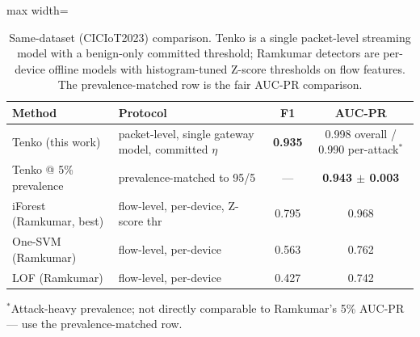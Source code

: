 \documentclass[10pt]{article}
\begin{document}
\begin{table}[h]
\centering
\caption{Same-dataset (CICIoT2023) comparison. Tenko is a single packet-level streaming model
with a benign-only committed threshold; Ramkumar detectors are per-device offline models with
histogram-tuned Z-score thresholds on flow features. The prevalence-matched row is the fair
AUC-PR comparison.}
\label{tab:sameds}
\begin{adjustbox}{max width=\textwidth}
\begin{tabular}{l l cc}
\toprule
\textbf{Method} & \textbf{Protocol} & \textbf{F1} & \textbf{AUC-PR} \\
\midrule
Tenko (this work)        & packet-level, single gateway model, committed $\eta$ & \textbf{0.935} & 0.998 overall / 0.990 per-attack$^\ast$ \\
\;Tenko @ 5\% prevalence & prevalence-matched to 95/5                          & --- & \textbf{0.943 $\pm$ 0.003} \\
iForest (Ramkumar, best) & flow-level, per-device, Z-score thr                 & 0.795 & 0.968 \\
One-SVM (Ramkumar)       & flow-level, per-device                              & 0.563 & 0.762 \\
LOF (Ramkumar)           & flow-level, per-device                              & 0.427 & 0.742 \\
\bottomrule
\end{tabular}
\end{adjustbox}
\end{table}
{\footnotesize $^\ast$Attack-heavy prevalence; not directly comparable to Ramkumar's 5\% AUC-PR
--- use the prevalence-matched row.}
\end{document}
